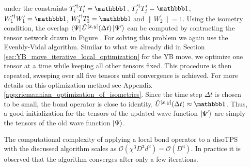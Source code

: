 under the constraints $T_i^{\prime\dagger}T_i^\prime = \id$, $T_j^{\prime\dagger}T_j^\prime = \id$, $W_1^{\prime\dagger}W_1^\prime = \id$, $W_3^{\prime\dagger}T_3^\prime = \id$ and $\lVert W_2^\prime\rVert = 1$.
Using the isometry condition, the overlap $\bra{\Psi}\hat{U}^{[x,y]}(\Delta t)\ket{\Psi^\prime}$ can be computed by contracting the tensor network drawn in Figure . For solving this problem we again use the Evenbly-Vidal algorithm. Similar to what we already did in Section \ref{sec:YB_move_iterative_local_optimization} for the YB move, we optimize one tensor at a time while keeping all other tensors fixed. This procedure is then repeated, sweeping over all five tensors until convergence is achieved. For more details on this optimization method see Appendix \ref{app:riemannian_optimization_of_isometries}. Since the time step $\Delta t$ is chosen to be small, the bond operator is close to identity, $\hat{U}^{[x,y]}(\Delta t)\approx\id$. Thus, a good initialization for the tensors of the updated wave function $\ket{\Psi^\prime}$ are simply the tensors of the old wave function $\ket{\Psi}$. \par
The computational complexity of applying a local bond operator to a disoTPS with the discussed algorithm scales as $\mathcal{O}(\chi^3D^3d^2) = \mathcal{O}(D^6)$. In practice it is observed that the algorithm converges after only a few iterations.